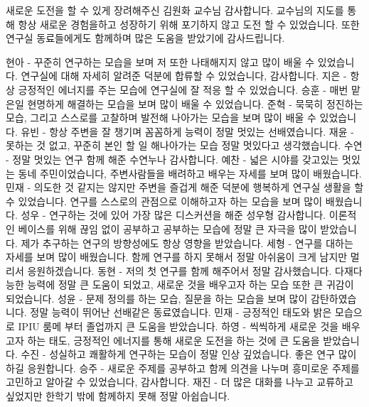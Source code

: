\documentclass[master,english,final]{postech-ucs}
\begin{document}
\begin{summarykorean}
    
\end{summarykorean}






\acknowledgement[korean]
새로운 도전을 할 수 있게 장려해주신 김원화 교수님 감사합니다. 교수님의 지도를 통해 항상 새로운 경험을하고 성장하기 위해 포기하지 않고 도전 할 수 있었습니다.
또한 연구실 동료들에게도 함께하며 많은 도움을 받았기에 감사드립니다.

현아 - 꾸준히 연구하는 모습을 보며 저 또한 나태해지지 않고 많이 배울 수 있었습니다. 연구실에 대해 자세히 알려준 덕분에 합류할 수 있었습니다, 감사합니다.
지은 - 항상 긍정적인 에너지를 주는 모습에 연구실에 잘 적응 할 수 있었습니다.
승훈 - 매번 맡은일 현명하게 해결하는 모습을 보며 많이 배울 수 있었습니다.
준혁 - 묵묵히 정진하는 모습, 그리고 스스로를 고찰하며 발전해 나아가는 모습을 보며 많이 배울 수 있었습니다.
유빈 - 항상 주변을 잘 챙기며 꼼꼼하게 능력이 정말 멋있는 선배였습니다.
재윤 - 못하는 것 없고, 꾸준히 본인 할 일 해나아가는 모습 정말 멋있다고 생각했습니다.
수연 - 정말 멋있는 연구 함께 해준 수연누나 감사합니다.
예찬 - 넓은 시야를 갖고있는 멋있는 동네 주민이었습니다, 주변사람들을 배려하고 배우는 자세를 보며 많이 배웠습니다.
민재 - 의도한 것 같지는 않지만 주변을 즐겁게 해준 덕분에 행복하게 연구실 생활을 할 수 있었습니다. 연구를 스스로의 관점으로 이해하고자 하는 모습을 보며 많이 배웠습니다.
성우 - 연구하는 것에 있어 가장 많은 디스커션을 해준 성우형 감사합니다. 이론적인 베이스를 위해 끊임 없이 공부하고 공부하는 모습에 정말 큰 자극을 많이 받았습니다. 제가 추구하는 연구의 방향성에도 항상 영향을 받았습니다.
세형 - 연구를 대하는 자세를 보며 많이 배웠습니다. 함께 연구를 하지 못해서 정말 아쉬움이 크게 남지만 멀리서 응원하겠습니다.
동현 - 저의 첫 연구를 함께 해주어서 정말 감사했습니다. 다재다능한 능력에 정말 큰 도움이 되었고, 새로운 것을 배우고자 하는 모습 또한 큰 귀감이 되었습니다.
성윤 - 문제 정의를 하는 모습, 질문을 하는 모습을 보며 많이 감탄하였습니다. 정말 능력이 뛰어난 선배같은 동료였습니다. 
민재 - 긍정적인 태도와 밝은 모습으로 IPIU 룸메 부터 졸업까지 큰 도움을 받았습니다.
하영 - 씩씩하게 새로운 것을 배우고자 하는 태도, 긍정적인 에너지를 통해 새로운 도전을 하는 것에 큰 도움을 받았습니다.
수진 - 성실하고 쾌활하게 연구하는 모습이 정말 인상 깊었습니다. 좋은 연구 많이 하길 응원합니다.
승주 - 새로운 주제를 공부하고 함께 의견을 나누며 흥미로운 주제를 고민하고 알아갈 수 있었습니다, 감사합니다.
재진 - 더 많은 대화를 나누고 교류하고 싶었지만 한학기 밖에 함께하지 못해 정말 아쉽습니다.
\end{document}
